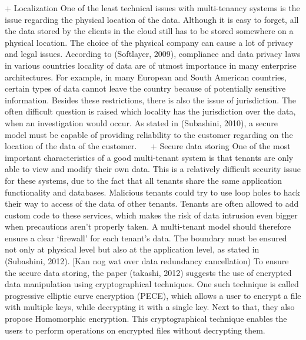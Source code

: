 + Localization
One of the least technical issues with multi-tenancy systems is the issue regarding the physical location of the data. Although it is easy to forget, all the data stored by the clients in the cloud still has to be stored somewhere on a physical location. The choice of the physical company can cause a lot of privacy and legal issues. According to (Softlayer, 2009), compliance and data privacy laws in various countries locality of data are of utmost importance in many enterprise architectures. For example, in many European and South American countries, certain types of data cannot leave the country because of potentially sensitive information. Besides these restrictions, there is also the issue of jurisdiction. The often difficult question is raised which locality has the jurisdiction over the data, when an investigation would occur. As stated in (Subashini, 2010), a secure model must be capable of providing reliability to the customer regarding on the location of the data of the customer.
 
+ Secure data storing
One of the most important characteristics of a good multi-tenant system is that tenants are only able to view and modify their own data. This is a relatively difficult security issue for these systems, due to the fact that all tenants share the same application functionality and databases. Malicious tenants could try to use loop holes to hack their way to access of the data of other tenants. Tenants are often allowed to add custom code to these services, which makes the risk of data intrusion even bigger when precautions aren’t properly taken. A multi-tenant model should therefore ensure a clear ‘firewall’ for each tenant’s data. The boundary must be ensured not only at physical level but also at the application level, as stated in (Subashini, 2012). [Kan nog wat over data redundancy cancellation)
To ensure the secure data storing, the paper (takashi, 2012) suggests the use of encrypted data manipulation using cryptographical techniques. One such technique is called progressive elliptic curve encryption (PECE), which allows a user to encrypt a file with multiple keys, while decrypting it with a single key. Next to that, they also propose Homomorphic encryption. This cryptographical technique enables the users to perform operations on encrypted files without decrypting them.

